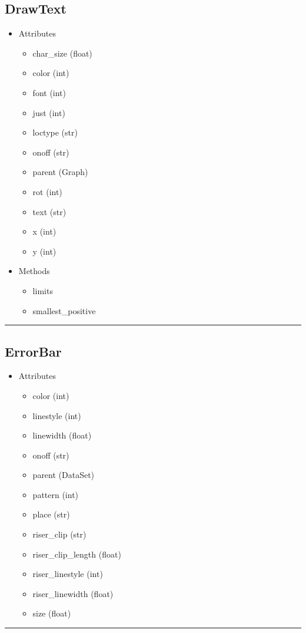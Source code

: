 \documentclass[10pt]{article}
\begin{document}
\begin{multicols}{4}
\subsection*{\footnotesize DrawText}
\begin{itemize}
\item Attributes
\begin{itemize}
\item char\_size (float)
\item color (int)
\item font (int)
\item just (int)
\item loctype (str)
\item onoff (str)
\item parent (Graph)
\item rot (int)
\item text (str)
\item x (int)
\item y (int)
\end{itemize}
\item Methods
\begin{itemize}
\item limits
\item smallest\_positive
\end{itemize}
\end{itemize}
\vspace{0.5em}
\hrule
\vspace{0.1em}
\subsection*{\footnotesize ErrorBar}
\begin{itemize}
\item Attributes
\begin{itemize}
\item color (int)
\item linestyle (int)
\item linewidth (float)
\item onoff (str)
\item parent (DataSet)
\item pattern (int)
\item place (str)
\item riser\_clip (str)
\item riser\_clip\_length (float)
\item riser\_linestyle (int)
\item riser\_linewidth (float)
\item size (float)
\end{itemize}
\end{itemize}
\vspace{0.5em}
\hrule
\vspace{0.1em}

\end{multicols}
\end{document}
